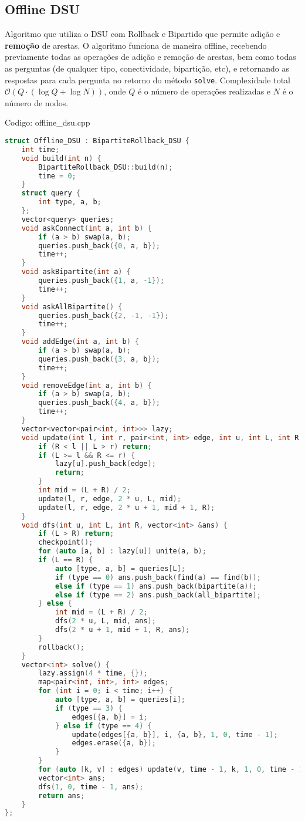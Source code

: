 \documentclass[10pt, a4paper, oneside]{book}
\begin{document}
\subsection{Offline DSU}


Algoritmo que utiliza o DSU com Rollback e Bipartido que permite adição e \textbf{remoção} de arestas. O algoritmo funciona de maneira offline, recebendo previamente todas as operações de adição e remoção de arestas, bem como todas as perguntas (de qualquer tipo, conectividade, bipartição, etc), e retornando as respostas para cada pergunta no retorno do método \texttt{solve}. Complexidade total $\mathcal{O}(Q \cdot (\log Q + \log N))$, onde $Q$ é o número de operações realizadas e $N$ é o número de nodos.

\hfill

Codigo: offline\_dsu.cpp

\begin{lstlisting}[language=C++]
struct Offline_DSU : BipartiteRollback_DSU {
    int time;
    void build(int n) {
        BipartiteRollback_DSU::build(n);
        time = 0;
    }
    struct query {
        int type, a, b;
    };
    vector<query> queries;
    void askConnect(int a, int b) {
        if (a > b) swap(a, b);
        queries.push_back({0, a, b});
        time++;
    }
    void askBipartite(int a) {
        queries.push_back({1, a, -1});
        time++;
    }
    void askAllBipartite() {
        queries.push_back({2, -1, -1});
        time++;
    }
    void addEdge(int a, int b) {
        if (a > b) swap(a, b);
        queries.push_back({3, a, b});
        time++;
    }
    void removeEdge(int a, int b) {
        if (a > b) swap(a, b);
        queries.push_back({4, a, b});
        time++;
    }
    vector<vector<pair<int, int>>> lazy;
    void update(int l, int r, pair<int, int> edge, int u, int L, int R) {
        if (R < l || L > r) return;
        if (L >= l && R <= r) {
            lazy[u].push_back(edge);
            return;
        }
        int mid = (L + R) / 2;
        update(l, r, edge, 2 * u, L, mid);
        update(l, r, edge, 2 * u + 1, mid + 1, R);
    }
    void dfs(int u, int L, int R, vector<int> &ans) {
        if (L > R) return;
        checkpoint();
        for (auto [a, b] : lazy[u]) unite(a, b);
        if (L == R) {
            auto [type, a, b] = queries[L];
            if (type == 0) ans.push_back(find(a) == find(b));
            else if (type == 1) ans.push_back(bipartite(a));
            else if (type == 2) ans.push_back(all_bipartite);
        } else {
            int mid = (L + R) / 2;
            dfs(2 * u, L, mid, ans);
            dfs(2 * u + 1, mid + 1, R, ans);
        }
        rollback();
    }
    vector<int> solve() {
        lazy.assign(4 * time, {});
        map<pair<int, int>, int> edges;
        for (int i = 0; i < time; i++) {
            auto [type, a, b] = queries[i];
            if (type == 3) {
                edges[{a, b}] = i;
            } else if (type == 4) {
                update(edges[{a, b}], i, {a, b}, 1, 0, time - 1);
                edges.erase({a, b});
            }
        }
        for (auto [k, v] : edges) update(v, time - 1, k, 1, 0, time - 1);
        vector<int> ans;
        dfs(1, 0, time - 1, ans);
        return ans;
    }
};\end{lstlisting}
\hfill
\end{document}
